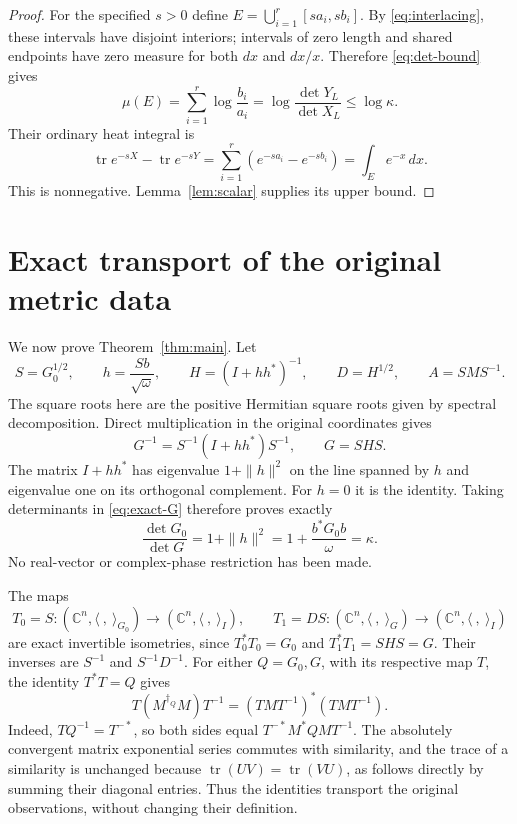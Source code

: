 \documentclass[11pt]{article}
\newcommand{\tr}{\operatorname{tr}}
\begin{document}
\begin{proof}
For the specified $s>0$ define
$E=\bigcup_{i=1}^r[sa_i,sb_i]$. By \eqref{eq:interlacing}, these
intervals have disjoint interiors; intervals of zero length and
shared endpoints have zero measure for both $dx$ and $dx/x$.
Therefore \eqref{eq:det-bound} gives
\[
 \mu(E)=\sum_{i=1}^r\log\frac{b_i}{a_i}
       =\log\frac{\det Y_L}{\det X_L}\leq\log\kappa.
\]
Their ordinary heat integral is
\[
 \tr e^{-sX}-\tr e^{-sY}
   =\sum_{i=1}^r(e^{-sa_i}-e^{-sb_i})
   =\int_E e^{-x}\,dx.
\]
This is nonnegative. Lemma~\ref{lem:scalar} supplies its upper bound.
\end{proof}

\section{Exact transport of the original metric data}
We now prove Theorem~\ref{thm:main}. Let
\begin{equation}\label{eq:transport-data}
 S=G_0^{1/2},\qquad h=\frac{Sb}{\sqrt\omega},\qquad
 H=(I+hh^*)^{-1},\qquad D=H^{1/2},\qquad A=SMS^{-1}.
\end{equation}
The square roots here are the positive Hermitian square roots given
by spectral decomposition. Direct multiplication in the original
coordinates gives
\begin{equation}\label{eq:exact-G}
 G^{-1}=S^{-1}(I+hh^*)S^{-1},\qquad G=SHS.
\end{equation}
The matrix $I+hh^*$ has eigenvalue $1+\|h\|^2$ on the line spanned
by $h$ and eigenvalue one on its orthogonal complement. For $h=0$
it is the identity. Taking determinants in \eqref{eq:exact-G}
therefore proves exactly
\[
 \frac{\det G_0}{\det G}=1+\|h\|^2
                    =1+\frac{b^*G_0b}{\omega}=\kappa.
\]
No real-vector or complex-phase restriction has been made.

The maps
\begin{equation}\label{eq:isometries}
 T_0=S:(\mathbb C^n,\langle\ ,\ \rangle_{G_0})
          \longrightarrow(\mathbb C^n,\langle\ ,\ \rangle_I),
 \qquad
 T_1=DS:(\mathbb C^n,\langle\ ,\ \rangle_G)
          \longrightarrow(\mathbb C^n,\langle\ ,\ \rangle_I)
\end{equation}
are exact invertible isometries, since $T_0^*T_0=G_0$ and
$T_1^*T_1=SHS=G$. Their inverses are $S^{-1}$ and $S^{-1}D^{-1}$.
For either $Q=G_0,G$, with its respective map $T$, the identity
$T^*T=Q$ gives
\begin{equation}\label{eq:adjoint-intertwining}
 T(M^{\dagger_Q}M)T^{-1}
   =(TMT^{-1})^*(TMT^{-1}).
\end{equation}
Indeed, $TQ^{-1}=T^{-*}$, so both sides equal
$T^{-*}M^*QM T^{-1}$. The absolutely convergent matrix exponential
series commutes with similarity, and the trace of a similarity
is unchanged because $\tr(UV)=\tr(VU)$, as follows directly by
summing their diagonal entries. Thus the identities transport the
original observations, without changing their definition.
\end{document}

